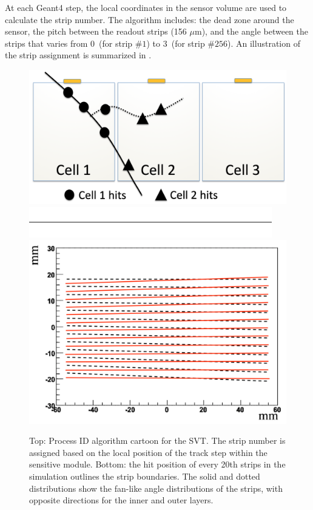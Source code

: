 At each Geant4 step, the local coordinates in the sensor volume are used to calculate the strip number.
The algorithm includes: the dead zone around the sensor, the pitch between the readout strips (156 $\mu$m), and the angle
between the strips that varies from 0\mdeg \ (for strip $\# 1$) to 3\mdeg \ (for strip  $\# 256$).
An illustration of the strip assignment is summarized in .

\begin{figure}
	\centering
	\includegraphics[width=0.99\columnwidth,keepaspectratio]{img/bstHit.png}
	\includegraphics[width=0.99\columnwidth,keepaspectratio]{img/blank.png}
	\includegraphics[width=0.99\columnwidth,keepaspectratio]{img/bstStrip.png}
	\caption{Top: Process ID algorithm cartoon for the SVT. The strip number is assigned based on the local
             position of the track step within the sensitive module.
             Bottom: the hit position of every 20th strips in the simulation outlines the strip boundaries.
             The solid and dotted distributions show the fan-like angle distributions of the strips, with opposite
             directions for the inner and outer layers. }
	\label{fig:processID}
\end{figure}

